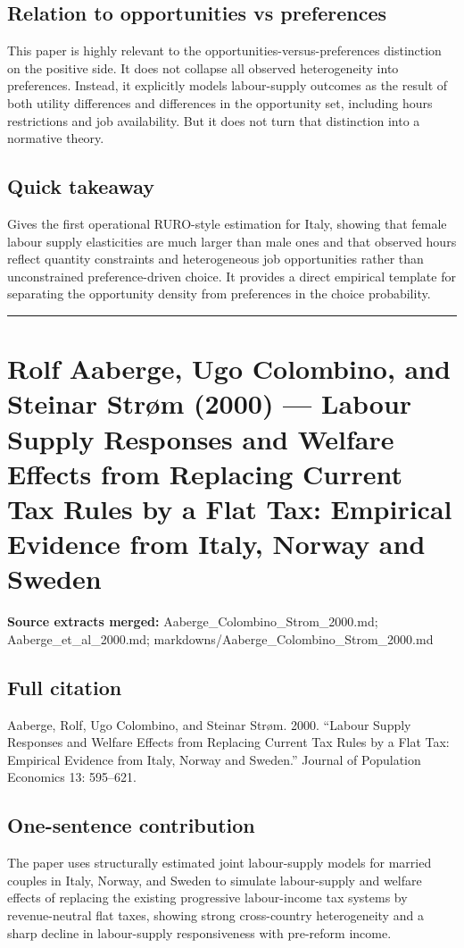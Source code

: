 \documentclass[11pt,a4paper]{article}
\begin{document}
\subsection*{Relation to opportunities vs preferences}
This paper is highly relevant to the opportunities-versus-preferences distinction on the positive side. It does not collapse all observed heterogeneity into preferences. Instead, it explicitly models labour-supply outcomes as the result of both utility differences and differences in the opportunity set, including hours restrictions and job availability. But it does not turn that distinction into a normative theory.

\subsection*{Quick takeaway}
Gives the first operational RURO-style estimation for Italy, showing that female labour supply elasticities are much larger than male ones and that observed hours reflect quantity constraints and heterogeneous job opportunities rather than unconstrained preference-driven choice. It provides a direct empirical template for separating the opportunity density from preferences in the choice probability.


\medskip\hrule\medskip

\section*{Rolf Aaberge, Ugo Colombino, and Steinar Strøm (2000) — Labour Supply Responses and Welfare Effects from Replacing Current Tax Rules by a Flat Tax: Empirical Evidence from Italy, Norway and Sweden}

\textbf{Source extracts merged:} Aaberge\_Colombino\_Strom\_2000.md; Aaberge\_et\_al\_2000.md; markdowns/Aaberge\_Colombino\_Strom\_2000.md

\subsection*{Full citation}
Aaberge, Rolf, Ugo Colombino, and Steinar Strøm. 2000. “Labour Supply Responses and Welfare Effects from Replacing Current Tax Rules by a Flat Tax: Empirical Evidence from Italy, Norway and Sweden.” Journal of Population Economics 13: 595–621.

\subsection*{One-sentence contribution}
The paper uses structurally estimated joint labour-supply models for married couples in Italy, Norway, and Sweden to simulate labour-supply and welfare effects of replacing the existing progressive labour-income tax systems by revenue-neutral flat taxes, showing strong cross-country heterogeneity and a sharp decline in labour-supply responsiveness with pre-reform income.
\end{document}
